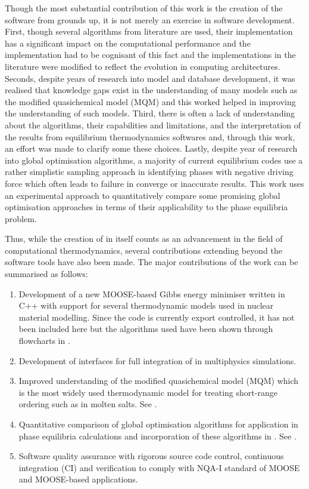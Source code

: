 	Though the most substantial contribution of this work is the creation of the software from grounds up, it is not merely an exercise in software development. First, though several algorithms from literature are used, their implementation has a significant impact on the computational performance and the implementation had to be cognisant of this fact and the implementations in the literature were modified to reflect the evolution in computing architectures. Seconds, despite years of research into model and database development, it was realised that knowledge gaps exist in the understanding of many models such as the modified quasichemical model (MQM) and this worked helped in improving the understanding of such models. Third, there is often a lack of understanding about the algorithms, their capabilities and limitations, and the interpretation of the results from equilibrium thermodynamics softwares and, through this work, an effort was made to clarify some these choices. Lastly, despite year of research into global optimisation algorithms, a majority of current equilibrium codes use a rather simplistic sampling approach in identifying phases with negative driving force which often leads to failure in converge or inaccurate results. This work uses an experimental approach to quantitatively compare some promising global optimisation approaches in terms of their applicability to the phase equilibria problem. 
	
	Thus, while the creation of {\GEM} in itself counts as an advancement in the field of computational thermodynamics, several contributions extending beyond the software tools have also been made. The major contributions of the work can be summarised as follows:
	\begin{enumerate}
		\item Development of a new MOOSE-based Gibbs energy minimiser written in C++ with support for several thermodynamic models used in nuclear material modelling. Since the code is currently export controlled, it has not been included here but the algorithms used have been shown through flowcharts in .
		\item Development of interfaces for full integration of {\GEM} in multiphysics simulations.
		\item Improved understanding of the modified quasichemical model (MQM) which is the most widely used thermodynamic model for treating short-range ordering such as in molten salts. See .
		\item Quantitative comparison of global optimisation algorithms for application in phase equilibria calculations and incorporation of these algorithms in \GEM. See .
		\item Software quality assurance  with rigorous source code control, continuous integration (CI) and verification to comply with NQA-I standard of MOOSE and MOOSE-based applications.
	\end{enumerate}

